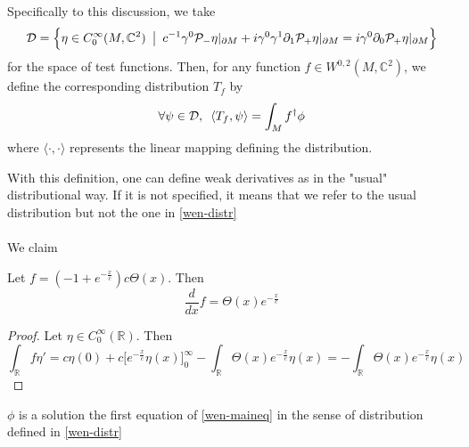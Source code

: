 \begin{definition}\label{wen-distr}
Specifically to this discussion, 
we take
\begin{equation*}
\mathcal{D} = \Big\{\eta \in C^{\infty}_0(M, \mathbb{C}^2) \enskip\big\vert \enskip c^{-1}\gamma^0\mathcal{P}_-\eta\vert_{\partial M} + i\gamma^0\gamma^1\partial_1\mathcal{P}_+\eta\vert_{\partial M}= i\gamma^ 0\partial_0\mathcal{P}_+\eta\vert_{\partial M} \Big\}
\end{equation*}
for the space of test functions. 
Then, for any function $f \in W^{0,2}(M, \mathbb{C}^2)$, we define the corresponding distribution $T_f$ by
\begin{equation*}
\forall \psi\in \mathcal{D}, \enskip \langle T_f, \psi\rangle = \int_M f^\dagger \phi
\end{equation*}
where $\langle \cdot , \cdot \rangle$ represents the linear mapping defining the distribution.
\end{definition}
With this definition, one can define weak derivatives as in the "usual" distributional way. 
If it is not specified, it means that we refer to the usual distribution but not the one in \cref{wen-distr} \\\\
We claim
\begin{lemma}\label{wen-lem}
Let $f = (-1+ e^{-\frac{x}{c}})c\Theta(x)$. Then \begin{equation*}\frac{d}{d x} f = \Theta(x)e^{-\frac {x}{c}}\end{equation*}
\end{lemma}
\begin{proof}
Let $\eta\in C_0^\infty(\mathbb{R})$. Then
\begin{equation*}
\int_\mathbb{R} f \eta'  =   c\eta(0) + c\Big[ e^{-\frac{x}{c}} \eta(x) \Big]^\infty_0 - \int_\mathbb{R}\Theta(x)e^{-\frac{x}{c}}\eta(x) = -\int_\mathbb{R}\Theta(x)e^{-\frac{x}{c}}\eta(x)
\end{equation*}
\begin{equation*}
\end{equation*}
\end{proof}
\begin{proposition}
$\phi$ is a solution the first equation of \cref{wen-maineq} in the sense of distribution defined in \cref{wen-distr}\end{proposition}
